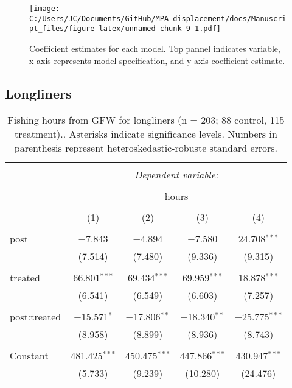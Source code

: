 \documentclass[]{article}
\theoremstyle{definition}
\theoremstyle{definition}
\theoremstyle{definition}
\theoremstyle{remark}
\begin{document}
\begin{figure}
\centering
\texttt{[image: C:/Users/JC/Documents/GitHub/MPA\_displacement/docs/Manuscript\_files/figure-latex/unnamed-chunk-9-1.pdf]}
\caption{\label{fig:unnamed-chunk-9}\label{fig:puse}Coefficient estimates
for each model. Top pannel indicates variable, x-axis represents model
specification, and y-axis coefficient estimate.}
\end{figure}

\clearpage

\subsection{Longliners}\label{longliners}

\begin{table}[!htbp] \centering 
  \caption{\label{tab:long}Fishing hours from GFW for longliners (n = 203; 88 control, 115 treatment).. Asterisks indicate significance levels. Numbers in parenthesis represent heteroskedastic-robuste standard errors.} 
  \label{} 
\begin{tabular}{@{\extracolsep{5pt}}lcccc} 
\\[-1.8ex]\hline 
\hline \\[-1.8ex] 
 & \multicolumn{4}{c}{\textit{Dependent variable:}} \\ 
\cline{2-5} 
\\[-1.8ex] & \multicolumn{4}{c}{hours} \\ 
\\[-1.8ex] & (1) & (2) & (3) & (4)\\ 
\hline \\[-1.8ex] 
 post & $-$7.843 & $-$4.894 & $-$7.580 & 24.708$^{***}$ \\ 
  & (7.514) & (7.480) & (9.336) & (9.315) \\ 
  & & & & \\ 
 treated & 66.801$^{***}$ & 69.434$^{***}$ & 69.959$^{***}$ & 18.878$^{***}$ \\ 
  & (6.541) & (6.549) & (6.603) & (7.257) \\ 
  & & & & \\ 
 post:treated & $-$15.571$^{*}$ & $-$17.806$^{**}$ & $-$18.340$^{**}$ & $-$25.775$^{***}$ \\ 
  & (8.958) & (8.899) & (8.936) & (8.743) \\ 
  & & & & \\ 
 Constant & 481.425$^{***}$ & 450.475$^{***}$ & 447.866$^{***}$ & 430.947$^{***}$ \\ 
  & (5.733) & (9.239) & (10.280) & (24.476) \\ 

\end{tabular}
\end{table}
\end{document}
